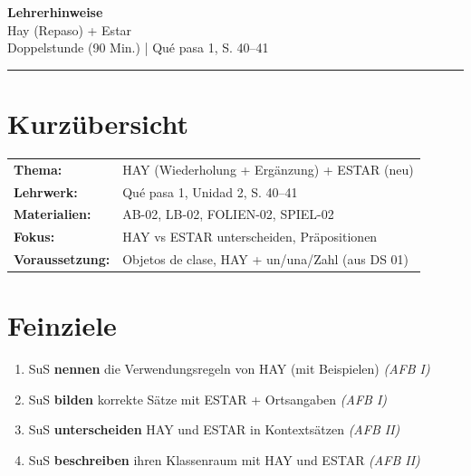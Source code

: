\documentclass[11pt,a4paper]{article}
\begin{document}
\begin{center}
{\Large\textcolor{fach}{\textbf{Lehrerhinweise}}}\\[0.3cm]
{\large Hay (Repaso) + Estar}\\[0.2cm]
{\normalsize Doppelstunde (90 Min.) | Qué pasa 1, S. 40--41}
\end{center}

\vspace{0.5cm}
\hrule
\vspace{0.5cm}

\section*{Kurzübersicht}

\begin{tabular}{ll}
\textbf{Thema:} & HAY (Wiederholung + Ergänzung) + ESTAR (neu) \\
\textbf{Lehrwerk:} & Qué pasa 1, Unidad 2, S. 40--41 \\
\textbf{Materialien:} & AB-02, LB-02, FOLIEN-02, SPIEL-02 \\
\textbf{Fokus:} & HAY vs ESTAR unterscheiden, Präpositionen \\
\textbf{Voraussetzung:} & Objetos de clase, HAY + un/una/Zahl (aus DS 01) \\
\end{tabular}

\vspace{0.5cm}

\section*{Feinziele}

\begin{enumerate}[label=\textbf{FZ\arabic*:}, leftmargin=2.5em]
    \item SuS \textbf{nennen} die Verwendungsregeln von HAY (mit Beispielen) \textit{(AFB I)}
    \item SuS \textbf{bilden} korrekte Sätze mit ESTAR + Ortsangaben \textit{(AFB I)}
    \item SuS \textbf{unterscheiden} HAY und ESTAR in Kontextsätzen \textit{(AFB II)}
    \item SuS \textbf{beschreiben} ihren Klassenraum mit HAY und ESTAR \textit{(AFB II)}
\end{enumerate}
\end{document}
